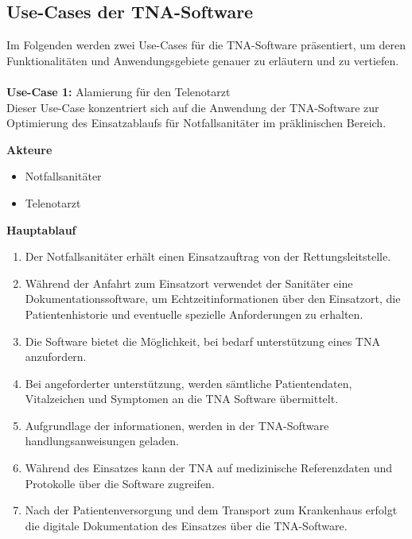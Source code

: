 \subsection{Use-Cases der TNA-Software}

Im Folgenden werden zwei Use-Cases für die TNA-Software präsentiert, um deren Funktionalitäten und Anwendungsgebiete genauer zu erläutern und zu vertiefen. \\\\

\textbf{Use-Case 1:} Alamierung für den Telenotarzt \\

Dieser Use-Case konzentriert sich auf die Anwendung der TNA-Software zur Optimierung des Einsatzablaufs für Notfallsanitäter im präklinischen Bereich.

\textbf{Akteure}\\

\begin{itemize}
    \item Notfallsanitäter
    \item Telenotarzt
\end{itemize}

\textbf{Hauptablauf}\\


\begin{enumerate}
\item Der Notfallsanitäter erhält einen Einsatzauftrag von der Rettungsleitstelle.
\item Während der Anfahrt zum Einsatzort verwendet der Sanitäter eine Dokumentationssoftware, um Echtzeitinformationen über den Einsatzort, die Patientenhistorie und eventuelle spezielle Anforderungen zu erhalten.
\item Die Software bietet die Möglichkeit, bei bedarf unterstützung eines TNA anzufordern.
\item Bei angeforderter unterstützung, werden sämtliche Patientendaten, Vitalzeichen und Symptomen an die TNA Software übermittelt.
\item Aufgrundlage der informationen, werden in der TNA-Software handlungsanweisungen geladen.
\item Während des Einsatzes kann der TNA auf medizinische Referenzdaten und Protokolle über die Software zugreifen.
\item Nach der Patientenversorgung und dem Transport zum Krankenhaus erfolgt die digitale Dokumentation des Einsatzes über die TNA-Software.
\end{enumerate}


